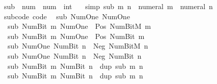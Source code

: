 \begin{isabellebody}
\ sub\ {\isacharcolon}{\kern0pt}{\isacharcolon}{\kern0pt}\ {\isachardoublequoteopen}num\ {\isasymRightarrow}\ num\ {\isasymRightarrow}\ int{\isachardoublequoteclose}\isanewline
\ \ \ {\isacharbrackleft}{\kern0pt}simp{\isacharbrackright}{\kern0pt}{\isacharcolon}{\kern0pt}\ {\isachardoublequoteopen}sub\ m\ n\ {\isacharequal}{\kern0pt}\ numeral\ m\ {\isacharminus}{\kern0pt}\ numeral\ n{\isachardoublequoteclose}\isanewline
\isanewline
{}\isamarkupfalse%
\ sub{\isacharunderscore}{\kern0pt}code\ {\isacharbrackleft}{\kern0pt}code{\isacharbrackright}{\kern0pt}{\isacharcolon}{\kern0pt}\isanewline
\ \ {\isachardoublequoteopen}sub\ Num{\isachardot}{\kern0pt}One\ Num{\isachardot}{\kern0pt}One\ {\isacharequal}{\kern0pt}\ {}{\isachardoublequoteclose}\isanewline
\ \ {\isachardoublequoteopen}sub\ {\isacharparenleft}{\kern0pt}Num{\isachardot}{\kern0pt}Bit{}\ m{\isacharparenright}{\kern0pt}\ Num{\isachardot}{\kern0pt}One\ {\isacharequal}{\kern0pt}\ Pos\ {\isacharparenleft}{\kern0pt}Num{\isachardot}{\kern0pt}BitM\ m{\isacharparenright}{\kern0pt}{\isachardoublequoteclose}\isanewline
\ \ {\isachardoublequoteopen}sub\ {\isacharparenleft}{\kern0pt}Num{\isachardot}{\kern0pt}Bit{}\ m{\isacharparenright}{\kern0pt}\ Num{\isachardot}{\kern0pt}One\ {\isacharequal}{\kern0pt}\ Pos\ {\isacharparenleft}{\kern0pt}Num{\isachardot}{\kern0pt}Bit{}\ m{\isacharparenright}{\kern0pt}{\isachardoublequoteclose}\isanewline
\ \ {\isachardoublequoteopen}sub\ Num{\isachardot}{\kern0pt}One\ {\isacharparenleft}{\kern0pt}Num{\isachardot}{\kern0pt}Bit{}\ n{\isacharparenright}{\kern0pt}\ {\isacharequal}{\kern0pt}\ Neg\ {\isacharparenleft}{\kern0pt}Num{\isachardot}{\kern0pt}BitM\ n{\isacharparenright}{\kern0pt}{\isachardoublequoteclose}\isanewline
\ \ {\isachardoublequoteopen}sub\ Num{\isachardot}{\kern0pt}One\ {\isacharparenleft}{\kern0pt}Num{\isachardot}{\kern0pt}Bit{}\ n{\isacharparenright}{\kern0pt}\ {\isacharequal}{\kern0pt}\ Neg\ {\isacharparenleft}{\kern0pt}Num{\isachardot}{\kern0pt}Bit{}\ n{\isacharparenright}{\kern0pt}{\isachardoublequoteclose}\isanewline
\ \ {\isachardoublequoteopen}sub\ {\isacharparenleft}{\kern0pt}Num{\isachardot}{\kern0pt}Bit{}\ m{\isacharparenright}{\kern0pt}\ {\isacharparenleft}{\kern0pt}Num{\isachardot}{\kern0pt}Bit{}\ n{\isacharparenright}{\kern0pt}\ {\isacharequal}{\kern0pt}\ dup\ {\isacharparenleft}{\kern0pt}sub\ m\ n{\isacharparenright}{\kern0pt}{\isachardoublequoteclose}\isanewline
\ \ {\isachardoublequoteopen}sub\ {\isacharparenleft}{\kern0pt}Num{\isachardot}{\kern0pt}Bit{}\ m{\isacharparenright}{\kern0pt}\ {\isacharparenleft}{\kern0pt}Num{\isachardot}{\kern0pt}Bit{}\ n{\isacharparenright}{\kern0pt}\ {\isacharequal}{\kern0pt}\ dup\ {\isacharparenleft}{\kern0pt}sub\ m\ n{\isacharparenright}{\kern0pt}{\isachardoublequoteclose}\isanewline

\end{isabellebody}
